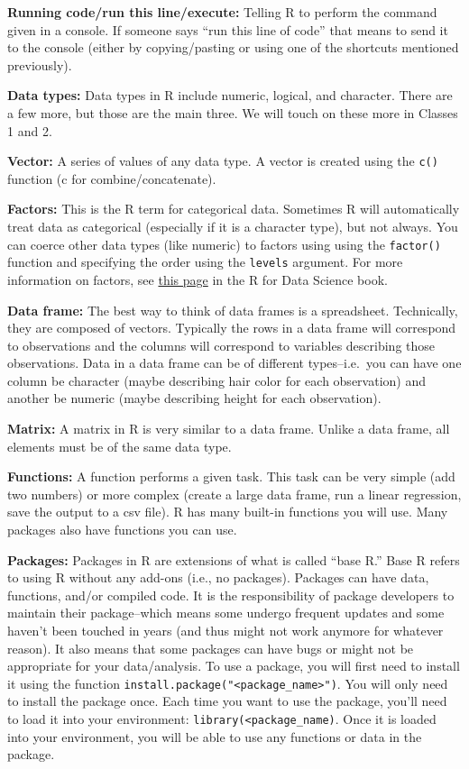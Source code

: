 \documentclass[
  letterpaper,
  DIV=11,
  numbers=noendperiod]{scrreprt}
\begin{document}
\textbf{Running code/run this line/execute:} Telling R to perform the
command given in a console. If someone says ``run this line of code''
that means to send it to the console (either by copying/pasting or using
one of the shortcuts mentioned previously).

\textbf{Data types:} Data types in R include numeric, logical, and
character. There are a few more, but those are the main three. We will
touch on these more in Classes 1 and 2.

\textbf{Vector:} A series of values of any data type. A vector is
created using the \texttt{c()} function (c for combine/concatenate).

\textbf{Factors:} This is the R term for categorical data. Sometimes R
will automatically treat data as categorical (especially if it is a
character type), but not always. You can coerce other data types (like
numeric) to factors using using the \texttt{factor()} function and
specifying the order using the \texttt{levels} argument. For more
information on factors, see
\href{https://r4ds.hadley.nz/factors.html}{this page} in the R for Data
Science book.

\textbf{Data frame:} The best way to think of data frames is a
spreadsheet. Technically, they are composed of vectors. Typically the
rows in a data frame will correspond to observations and the columns
will correspond to variables describing those observations. Data in a
data frame can be of different types--i.e.~you can have one column be
character (maybe describing hair color for each observation) and another
be numeric (maybe describing height for each observation).

\textbf{Matrix:} A matrix in R is very similar to a data frame. Unlike a
data frame, all elements must be of the same data type.

\textbf{Functions:} A function performs a given task. This task can be
very simple (add two numbers) or more complex (create a large data
frame, run a linear regression, save the output to a csv file). R has
many built-in functions you will use. Many packages also have functions
you can use.

\textbf{Packages:} Packages in R are extensions of what is called ``base
R.'' Base R refers to using R without any add-ons (i.e., no packages).
Packages can have data, functions, and/or compiled code. It is the
responsibility of package developers to maintain their package--which
means some undergo frequent updates and some haven't been touched in
years (and thus might not work anymore for whatever reason). It also
means that some packages can have bugs or might not be appropriate for
your data/analysis. To use a package, you will first need to install it
using the function
\texttt{install.package("\textless{}package\_name\textgreater{}")}. You
will only need to install the package once. Each time you want to use
the package, you'll need to load it into your environment:
\texttt{library(\textless{}package\_name\textquotesingle{})}. Once it is
loaded into your environment, you will be able to use any functions or
data in the package.
\end{document}
